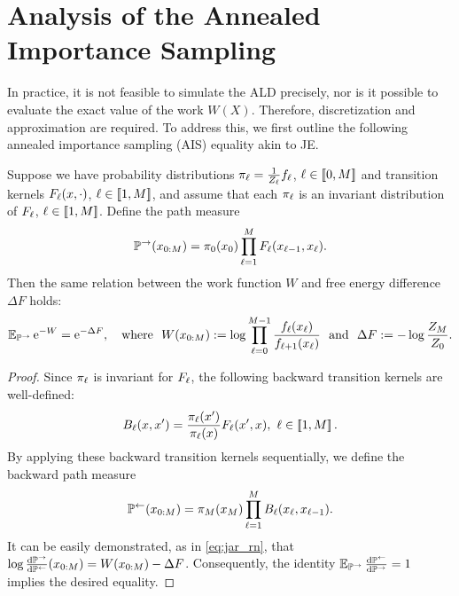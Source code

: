 \section{Analysis of the Annealed Importance Sampling}
\label{sec:ais}
In practice, it is not feasible to simulate the ALD precisely, nor is it possible to evaluate the exact value of the work $W(X)$. Therefore, discretization and approximation are required. To address this, we first outline the following annealed importance sampling (AIS) equality akin to JE. 

\begin{theorem} 
Suppose we have probability distributions $\pi_\ell=\frac{1}{Z_\ell}f_\ell$, $\ell\in\left[\!\left[0,M\right]\!\right]$ and transition kernels $F_\ell(x,\cdot)$, $\ell\in\left[\!\left[1,M\right]\!\right]$, and assume that each $\pi_\ell$ is an invariant distribution of $F_\ell$, $\ell\in\left[\!\left[1,M\right]\!\right]$. Define the path measure
    \begin{equation}
        \mathbb{P}^\to(x_{0:M})=\pi_0(x_0)\prod_{\ell=1}^MF_\ell(x_{\ell-1},x_\ell).
        \label{eq:ais_pr}
    \end{equation}
    Then the same relation between the work function $W$ and free energy difference $\Delta F$ holds:
    $$\operatorname{\mathbb{E}}_{\mathbb{P}^\to}\mathrm{e}^{-W}=\mathrm{e}^{-\Delta F},\quad\text{where}~~W(x_{0:M}):=\log\prod_{\ell=0}^{M-1}\frac{f_\ell(x_\ell)}{f_{\ell+1}(x_\ell)}~~\text{and}~~\Delta F:=-\log\frac{Z_M}{Z_0}.$$
    \label{thm:ais}
\end{theorem}
\vspace{-1em}
\begin{proof}
    Since $\pi_\ell$ is invariant for $F_\ell$, the following backward transition kernels are well-defined:
    $$B_\ell(x,x')=\frac{\pi_\ell(x')}{\pi_\ell(x)}F_\ell(x',x),~\ell\in\left[\!\left[1,M\right]\!\right].$$
    By applying these backward transition kernels sequentially, we define the backward path measure
    \begin{equation}
        \mathbb{P}^\gets(x_{0:M})=\pi_M(x_M)\prod_{\ell=1}^MB_\ell(x_\ell,x_{\ell-1}).
        \label{eq:ais_pl}
    \end{equation}
    It can be easily demonstrated, as in \cref{eq:jar_rn}, that $\log\frac{\mathrm{d}\mathbb{P}^\to}{\mathrm{d}\mathbb{P}^\gets}(x_{0:M})=W(x_{0:M})-\Delta F$. Consequently, the identity $\operatorname{\mathbb{E}}_{\mathbb{P}^\to}{\frac{\mathrm{d}\mathbb{P}^\gets}{\mathrm{d}\mathbb{P}^\to}}=1$ implies the desired equality.
\end{proof}

